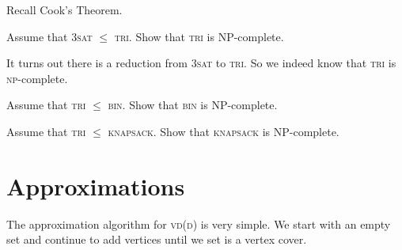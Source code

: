 Recall Cook's Theorem. 


\frmrule

\begin{example}
Assume that \textsc{3sat} $\leqslant$ \textsc{tri}. 
Show that \textsc{tri} is NP-complete.
\end{example}

\frmrule

It turns out there is a reduction from 
\textsc{3sat} to \textsc{tri}. So we indeed know that 
\textsc{tri} is \textsc{np}-complete.

\frmrule

\begin{example}
Assume that \textsc{tri} $\leqslant$ \textsc{bin}. 
Show that \textsc{bin} is NP-complete.
\end{example}

\frmrule

\begin{example}
Assume that \textsc{tri} $\leqslant$ \textsc{knapsack}. 
Show that \textsc{knapsack} is NP-complete.
\end{example}

\frmrule




\section{Approximations}

The approximation algorithm for \textsc{vd(d)} is very simple. 
We start with an empty set and continue to add 
vertices until we set is a vertex cover. 

